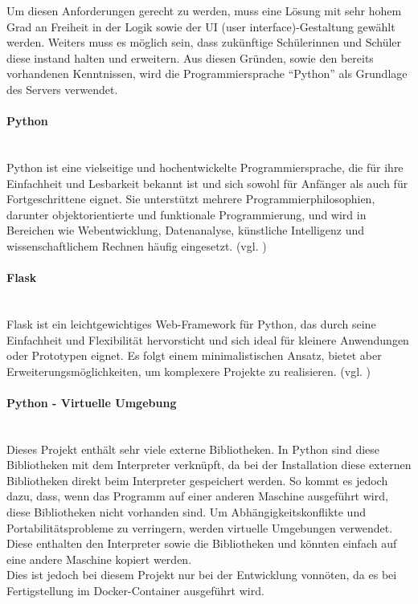 Um diesen Anforderungen gerecht zu werden, muss eine Lösung mit sehr hohem Grad an Freiheit in der Logik sowie der UI (user interface)-Gestaltung gewählt werden. Weiters muss es möglich sein, dass zukünftige Schülerinnen und Schüler diese instand halten und erweitern. Aus diesen Gründen, sowie den bereits vorhandenen Kenntnissen, wird die Programmiersprache \enquote{Python} als Grundlage des Servers verwendet.

\paragraph{Python}\mbox{}\\
Python ist eine vielseitige und hochentwickelte Programmiersprache, die für ihre Einfachheit und Lesbarkeit bekannt ist und sich sowohl für Anfänger als auch für Fortgeschrittene eignet. Sie unterstützt mehrere Programmierphilosophien, darunter objektorientierte und funktionale Programmierung, und wird in Bereichen wie Webentwicklung, Datenanalyse, künstliche Intelligenz und wissenschaftlichem Rechnen häufig eingesetzt. (vgl. \cite{gpt_python})

\paragraph{Flask}\mbox{}\\
Flask ist ein leichtgewichtiges Web-Framework für Python, das durch seine Einfachheit und Flexibilität hervorsticht und sich ideal für kleinere Anwendungen oder Prototypen eignet. Es folgt einem minimalistischen Ansatz, bietet aber Erweiterungsmöglichkeiten, um komplexere Projekte zu realisieren. (vgl. \cite{gpt_flask})

\paragraph{Python - Virtuelle Umgebung}\mbox{}\\
Dieses Projekt enthält sehr viele externe Bibliotheken. In Python sind diese Bibliotheken mit dem Interpreter verknüpft, da bei der Installation diese externen Bibliotheken direkt beim Interpreter gespeichert werden. So kommt es jedoch dazu, dass, wenn das Programm auf einer anderen Maschine ausgeführt wird, diese Bibliotheken nicht vorhanden sind. Um Abhängigkeitskonflikte und Portabilitätsprobleme zu verringern, werden virtuelle Umgebungen verwendet. Diese enthalten den Interpreter sowie die Bibliotheken und könnten einfach auf eine andere Maschine kopiert werden.\\ Dies ist jedoch bei diesem Projekt nur bei der Entwicklung vonnöten, da es bei Fertigstellung im Docker-Container ausgeführt wird.

